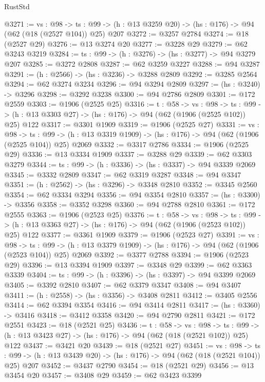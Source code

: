 \begin{lexlean}{RustStd}
\begin{coremodule}
{\begin{coremodule}
{{{{{{@3271 := {vs : @98} ->
  {ts : @99} -> (h : @13 @3259 @20) -> (hs : @176) -> @94 (@62 (@18 (@2527 @104)) @25) @207
@3272 := @3257 @2784
@3274 := @18 (@2527 @29)
@3276 := @13 @3274 @20
@3277 := @3228 @29
@3279 := @62 @3243 @3219
@3284 := {ts : @99} -> (h : @3276) -> (hs : @3277) -> @94 @3279 @207
@3285 := @3272 @2808
@3287 := @62 @3259 @3227
@3288 := @94 @3287
@3291 := (h : @2566) -> (hs : @3236) -> @3288 @2809
@3292 := @3285 @2564
@3294 := @62 @3274 @3234
@3296 := @94 @3294 @2809
@3297 := (hs : @3240) -> @3296
@3298 := @3292 @3238
@3300 := @94 @2786 @2809
@3301 := @172 @2559
@3303 := @1906 (@2525 @25)
@3316 := {t : @58} ->
  {vs : @98} ->
  {ts : @99} -> (h : @13 @3303 @27) -> (hs : @176) -> @94 (@62 (@1906 (@2525 @102)) @25) @122
@3317 := @3301 @1909
@3319 := @1906 (@2525 @27)
@3331 := {vs : @98} ->
  {ts : @99} -> (h : @13 @3319 @1909) -> (hs : @176) -> @94 (@62 (@1906 (@2525 @104)) @25) @2069
@3332 := @3317 @2786
@3334 := @1906 (@2525 @29)
@3336 := @13 @3334 @1909
@3337 := @3288 @29
@3339 := @62 @3303 @3279
@3344 := {ts : @99} -> (h : @3336) -> (hs : @3337) -> @94 @3339 @2069
@3345 := @3332 @2809
@3347 := @62 @3319 @3287
@3348 := @94 @3347
@3351 := (h : @2562) -> (hs : @3296) -> @3348 @2810
@3352 := @3345 @2560
@3354 := @62 @3334 @3294
@3356 := @94 @3354 @2810
@3357 := (hs : @3300) -> @3356
@3358 := @3352 @3298
@3360 := @94 @2788 @2810
@3361 := @172 @2555
@3363 := @1906 (@2523 @25)
@3376 := {t : @58} ->
  {vs : @98} ->
  {ts : @99} -> (h : @13 @3363 @27) -> (hs : @176) -> @94 (@62 (@1906 (@2523 @102)) @25) @122
@3377 := @3361 @1909
@3379 := @1906 (@2523 @27)
@3391 := {vs : @98} ->
  {ts : @99} -> (h : @13 @3379 @1909) -> (hs : @176) -> @94 (@62 (@1906 (@2523 @104)) @25) @2069
@3392 := @3377 @2788
@3394 := @1906 (@2523 @29)
@3396 := @13 @3394 @1909
@3397 := @3348 @29
@3399 := @62 @3363 @3339
@3404 := {ts : @99} -> (h : @3396) -> (hs : @3397) -> @94 @3399 @2069
@3405 := @3392 @2810
@3407 := @62 @3379 @3347
@3408 := @94 @3407
@3411 := (h : @2558) -> (hs : @3356) -> @3408 @2811
@3412 := @3405 @2556
@3414 := @62 @3394 @3354
@3416 := @94 @3414 @2811
@3417 := (hs : @3360) -> @3416
@3418 := @3412 @3358
@3420 := @94 @2790 @2811
@3421 := @172 @2551
@3423 := @18 (@2521 @25)
@3436 := {t : @58} ->
  {vs : @98} ->
  {ts : @99} -> (h : @13 @3423 @27) -> (hs : @176) -> @94 (@62 (@18 (@2521 @102)) @25) @122
@3437 := @3421 @20
@3439 := @18 (@2521 @27)
@3451 := {vs : @98} ->
  {ts : @99} -> (h : @13 @3439 @20) -> (hs : @176) -> @94 (@62 (@18 (@2521 @104)) @25) @207
@3452 := @3437 @2790
@3454 := @18 (@2521 @29)
@3456 := @13 @3454 @20
@3457 := @3408 @29
@3459 := @62 @3423 @3399
}}}}}}
\end{coremodule}}
\end{coremodule}
\end{lexlean}

